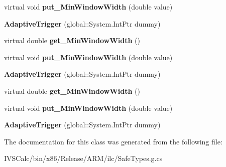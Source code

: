 \begin{DoxyCompactItemize}
virtual void {\bfseries put\+\_\+\+Min\+Window\+Width} (double value)
\item 
\mbox{\label{class_windows_1_1_u_i_1_1_xaml_1_1_adaptive_trigger_a3edc2397a70168ab359dfbe0d42e68c9}} 
{\bfseries Adaptive\+Trigger} (global\+::\+System.\+Int\+Ptr dummy)
\item 
\mbox{\label{class_windows_1_1_u_i_1_1_xaml_1_1_adaptive_trigger_adfb1ee646add0aa7b898417bb2de2a26}} 
virtual double {\bfseries get\+\_\+\+Min\+Window\+Width} ()
\item 
\mbox{\label{class_windows_1_1_u_i_1_1_xaml_1_1_adaptive_trigger_aaef2abc41ffee02ab99c48f532f2dfd1}} 
virtual void {\bfseries put\+\_\+\+Min\+Window\+Width} (double value)
\item 
\mbox{\label{class_windows_1_1_u_i_1_1_xaml_1_1_adaptive_trigger_a3edc2397a70168ab359dfbe0d42e68c9}} 
{\bfseries Adaptive\+Trigger} (global\+::\+System.\+Int\+Ptr dummy)
\item 
\mbox{\label{class_windows_1_1_u_i_1_1_xaml_1_1_adaptive_trigger_adfb1ee646add0aa7b898417bb2de2a26}} 
virtual double {\bfseries get\+\_\+\+Min\+Window\+Width} ()
\item 
\mbox{\label{class_windows_1_1_u_i_1_1_xaml_1_1_adaptive_trigger_aaef2abc41ffee02ab99c48f532f2dfd1}} 
virtual void {\bfseries put\+\_\+\+Min\+Window\+Width} (double value)
\item 
\mbox{\label{class_windows_1_1_u_i_1_1_xaml_1_1_adaptive_trigger_a3edc2397a70168ab359dfbe0d42e68c9}} 
{\bfseries Adaptive\+Trigger} (global\+::\+System.\+Int\+Ptr dummy)
\end{DoxyCompactItemize}


The documentation for this class was generated from the following file\+:\begin{DoxyCompactItemize}
\item 
I\+V\+S\+Calc/bin/x86/\+Release/\+A\+R\+M/ilc/Safe\+Types.\+g.\+cs\end{DoxyCompactItemize}
